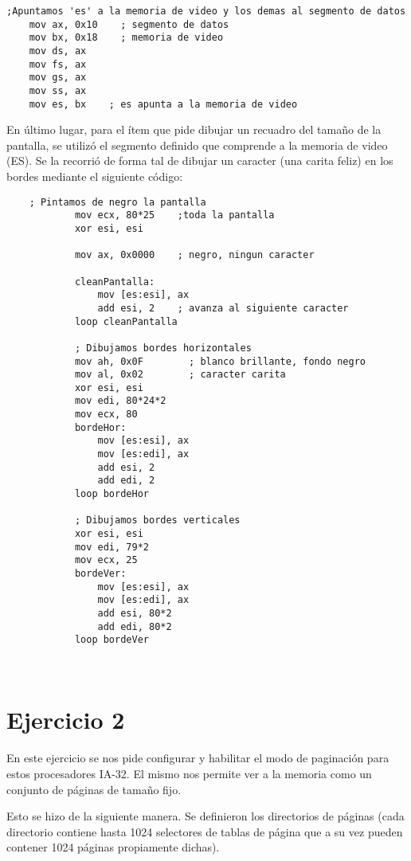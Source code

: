 \begin{verbatim}
;Apuntamos 'es' a la memoria de video y los demas al segmento de datos
	mov ax, 0x10    ; segmento de datos
	mov bx, 0x18    ; memoria de video
	mov ds, ax
	mov fs, ax
	mov gs, ax
	mov ss, ax
	mov es, bx    ; es apunta a la memoria de video

\end{verbatim}

En último lugar, para el ítem que pide dibujar un recuadro del tamaño de la pantalla, se utilizó el segmento definido que comprende a la memoria de video (ES). Se la recorrió de forma tal de dibujar un caracter (una carita feliz) en los bordes mediante el siguiente código:

\begin{verbatim}
    ; Pintamos de negro la pantalla
            mov ecx, 80*25    ;toda la pantalla
            xor esi, esi

            mov ax, 0x0000    ; negro, ningun caracter

            cleanPantalla:
                mov [es:esi], ax
                add esi, 2    ; avanza al siguiente caracter
            loop cleanPantalla

            ; Dibujamos bordes horizontales
            mov ah, 0x0F        ; blanco brillante, fondo negro
            mov al, 0x02        ; caracter carita
            xor esi, esi
            mov edi, 80*24*2
            mov ecx, 80
            bordeHor:
                mov [es:esi], ax
                mov [es:edi], ax
                add esi, 2
                add edi, 2
            loop bordeHor

            ; Dibujamos bordes verticales
            xor esi, esi
            mov edi, 79*2
            mov ecx, 25
            bordeVer:
                mov [es:esi], ax
                mov [es:edi], ax
                add esi, 80*2
                add edi, 80*2
            loop bordeVer

 
\end{verbatim}

\section{Ejercicio 2}

En este ejercicio se nos pide configurar y habilitar el modo de paginación para estos procesadores IA-32. El mismo nos permite ver a la memoria como un conjunto de páginas de tamaño fijo. %

Esto se hizo de la siguiente manera. Se definieron los directorios de páginas (cada directorio contiene hasta 1024 selectores de tablas de página que a su vez pueden contener 1024 páginas propiamente dichas). 

